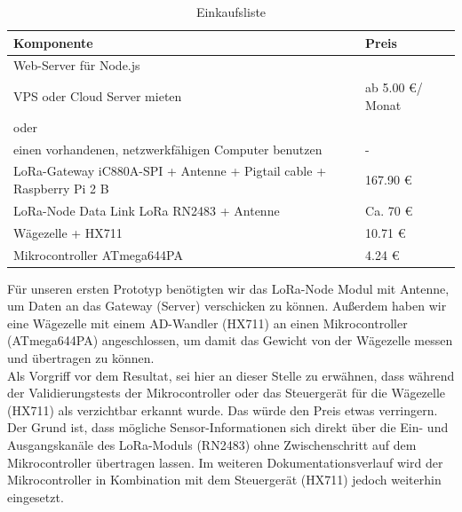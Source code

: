 \begin{table}[h]
    \caption{Einkaufsliste}
    \centering

    \begin{tabular}{ | l |  l | }
    \hline
    Komponente & Preis \\ \hline
    Web-Server für Node.js  & \\
    VPS oder Cloud Server mieten & ab 5.00 \euro / Monat \\
    oder & \\
    einen vorhandenen, netzwerkfähigen Computer benutzen & - \\ \hline
    LoRa-Gateway iC880A-SPI + Antenne + Pigtail cable + Raspberry Pi 2 B & 167.90 \euro \\ \hline
    LoRa-Node Data Link LoRa RN2483 + Antenne & Ca. 70 \euro \\ \hline
    Wägezelle + HX711 & 10.71 \euro \\ \hline
    Mikrocontroller ATmega644PA & 4.24 \euro \\ \hline
    \end{tabular}
\end{table}
\noindent
Für unseren ersten Prototyp benötigten wir das LoRa-Node Modul mit Antenne, um Daten an das Gateway (Server) verschicken zu können. Außerdem haben wir eine Wägezelle mit einem AD-Wandler (HX711) an einen Mikrocontroller (ATmega644PA) angeschlossen, um damit das Gewicht von der Wägezelle messen und übertragen zu können.\\
Als Vorgriff vor dem Resultat, sei hier an dieser Stelle zu erwähnen, dass während der Validierungstests der Mikrocontroller oder das Steuergerät für die Wägezelle (HX711) als verzichtbar erkannt wurde. Das würde den Preis etwas verringern. Der Grund ist, dass mögliche Sensor-Informationen sich direkt über die Ein- und Ausgangskanäle des LoRa-Moduls (RN2483) ohne Zwischenschritt auf dem Mikrocontroller übertragen lassen. Im weiteren Dokumentationsverlauf wird der Mikrocontroller in Kombination mit dem Steuergerät (HX711) jedoch weiterhin eingesetzt. \\

